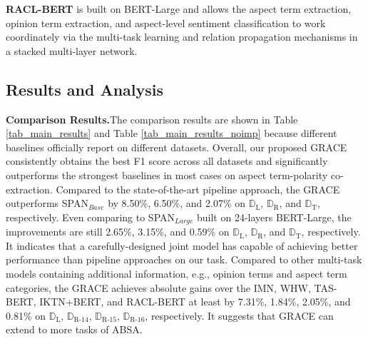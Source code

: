 \documentclass[11pt,a4paper]{article}
\begin{document}
\noindent
\textbf{RACL-BERT} \cite{chen2020racl} is built on BERT-Large and allows the aspect term extraction, opinion term extraction, and aspect-level sentiment classification to work coordinately via the multi-task learning and relation propagation mechanisms in a stacked multi-layer network.

\subsection{Results and Analysis}
\noindent
\textbf{Comparison Results.}\quad The comparison results are shown in Table \ref{tab_main_results} and Table \ref{tab_main_results_noimp} because different baselines officially report on different datasets. Overall, our proposed GRACE consistently obtains the best F1 score across all datasets and significantly outperforms the strongest baselines in most cases on aspect term-polarity co-extraction. Compared to the state-of-the-art pipeline approach, the GRACE outperforms SPAN$_{Base}$ by 8.50\%, 6.50\%, and 2.07\% on $\mathbb{D}_\text{L}$, $\mathbb{D}_\text{R}$, and $\mathbb{D}_\text{T}$, respectively. Even comparing to SPAN$_{Large}$ built on 24-layers BERT-Large, the improvements are still 2.65\%, 3.15\%, and 0.59\% on $\mathbb{D}_\text{L}$, $\mathbb{D}_\text{R}$, and $\mathbb{D}_\text{T}$, respectively. It indicates that a carefully-designed joint model has capable of achieving better performance than pipeline approaches on our task. Compared to other multi-task models containing additional information, e.g., opinion terms and aspect term categories, the GRACE achieves absolute gains over the IMN, WHW, TAS-BERT, IKTN+BERT, and RACL-BERT at least by 7.31\%, 1.84\%, 2.05\%, and 0.81\% on $\mathbb{D}_\text{L}$, $\mathbb{D}_\text{R-14}$, $\mathbb{D}_\text{R-15}$, $\mathbb{D}_\text{R-16}$, respectively. It suggests that GRACE can extend to more tasks of ABSA.
\end{document}
